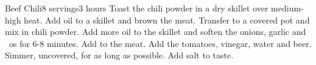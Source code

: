 \begin{recipe}{Beef Chili}{8 servings}{3 hours}
Toast the chili powder in a dry skillet over medium-high heat.
Add oil to a skillet and brown the meat.  Transfer to a covered pot and mix in chili powder.
Add more oil to the skillet and soften the onions, garlic and ~os for 6-8 minutes.  Add to the meat.
Add the tomatoes, vinegar, water and beer.  Simmer, uncovered, for as long as possible.  Add salt to taste.
\end{recipe}
